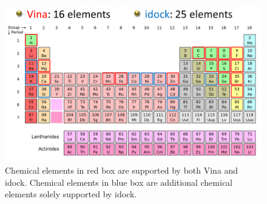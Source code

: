 \documentclass[12pt]{article}
\begin{document}
\clearpage

\begin{figure}
\begin{center}
\includegraphics[width=\linewidth]{ChemicalElements.png}
\caption{Chemical elements in red box are supported by both Vina and idock. Chemical elements in blue box are additional chemical elements solely supported by idock.}
\label{ChemicalElements}
\end{center}
\end{figure}

\clearpage
\end{document}
